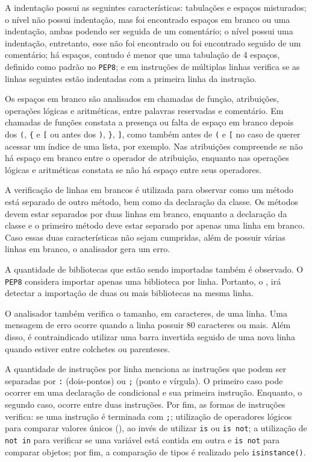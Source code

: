 	A indentação possui as seguintes características: tabulações e espaços misturados;
	o nível não possui indentação, mas foi encontrado espaços em branco ou uma indentação,
	ambas podendo ser seguida de um comentário; o nível possui uma indentação, entretanto,
	esse não foi encontrado ou foi encontrado seguido de um comentário; há espaços, contudo
	é menor que uma tabulação de 4 espaços, definido como padrão no \texttt{PEP8}; e em
	instruções de múltiplas linhas verifica se as linhas seguintes estão indentadas com
	a primeira linha da instrução.
	
	Os espaços em branco são analisados em chamadas de função, atribuições, operações
	lógicas e aritméticas, entre palavras reservadas e comentário. Em chamadas de
	funções constata a presença ou falta de espaço em branco depois dos 
	\texttt{(}, \texttt{\{} e \texttt{[} ou antes dos  \texttt{)},
	\texttt{\}}, \texttt{]}, como também antes de \texttt{(} e \texttt{[} no caso de
	querer acessar um índice de uma lista, por exemplo. Nas atribuições compreende se
	não há espaço em branco entre o operador de atribuição, enquanto nas operações
	lógicas e aritméticas constata se não há espaço entre seus operadores.
	
	A verificação de linhas em brancos é utilizada para observar como um método está
	separado de outro método, bem como da declaração da classe. Os métodos devem estar
	separados por duas linhas em branco, enquanto a declaração da classe e o primeiro
	método deve estar separado por apenas uma linha em branco. Caso essas duas
	características não sejam cumpridas, além de possuir várias linhas em branco,
	o analisador gera um erro.
	
	A quantidade de bibliotecas que estão sendo importadas também é observado. O
	\texttt{PEP8} considera importar apenas uma biblioteca por linha. Portanto,
	o , irá detectar a importação de duas ou mais bibliotecas na
	mesma linha.
	
	O analisador também verifica o tamanho, em caracteres, de uma linha. Uma mensagem
	de erro ocorre quando a linha possuir 80 caracteres ou mais. Além disso, é
	contraindicado utilizar uma barra invertida seguido de uma nova linha quando estiver
	entre colchetes ou parenteses.
	
	A quantidade de instruções por linha menciona as instruções que podem ser separadas
	por \texttt{:} (dois-pontos) ou \texttt{;} (ponto e vírgula). O primeiro caso pode
	ocorrer em uma declaração de condicional e sua primeira instrução. Enquanto, o segundo
	caso, ocorre entre duas instruções. Por fim, as formas de instruções verifica: se uma
	instrução é terminada com \texttt{;}; utilização de operadores lógicos para comparar
	valores únicos (), ao invés de utilizar \texttt{is} ou \texttt{is not};
	a utilização de \texttt{not in} para verificar se uma variável está contida em outra e
	\texttt{is not} para comparar objetos; por fim, a comparação de tipos é realizado pelo
	\texttt{isinstance()}.
	
